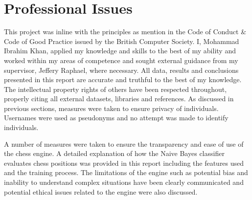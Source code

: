 \section{Professional Issues}

This project was inline with the principles as mention in the Code of Conduct \& Code of Good Practice issued by the British Computer Society. I, Mohammad Ibrahim Khan, applied my knowledge and skills to the best of my ability and worked within my areas of competence and sought external guidance from my supervisor, Jeffery Raphael, where necessary. All data, results and conclusions presented in this report are accurate and truthful to the best of my knowledge. The intellectual property rights of others have been respected throughout, properly citing all external datasets, libraries and references. As discussed in previous sections, measures were taken to ensure privacy of individuals. Usernames were used as pseudonyms and no attempt was made to identify individuals.  

A number of measures were taken to ensure the transparency and ease of use of the chess engine. A detailed explanation of how the Naive Bayes classifier evaluates chess positions was provided in this report including the features used and the training process. The limitations of the engine such as potential bias and inability to understand complex situations have been clearly communicated and potential ethical issues related to the engine were also discussed. 